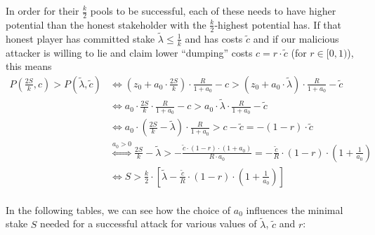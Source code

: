 \documentclass[11pt,a4paper]{article}
\begin{document}
In order for their \(\frac{k}{2}\) pools to be successful, each of these
needs to have higher potential than the honest stakeholder with the
\(\frac{k}{2}\)-highest potential has. If that honest player has
committed stake \(\tilde{\lambda}\leq\frac{1}{k}\) and has costs
\(\tilde{c}\) and if our malicious attacker is willing to lie and claim
lower ``dumping'' costs \(c=r\cdot\tilde{c}\) (for \(r\in[0,1)\)), this
means \[
\begin{split}
    P\left(\frac{2S}{k}, c\right) > P(\tilde{\lambda}, \tilde{c})
    &\Longleftrightarrow
    \left(z_0+a_0\cdot\frac{2S}{k}\right)\cdot\frac{R}{1+a_0}-c > \left(z_0+a_0\cdot\tilde{\lambda}\right)\cdot\frac{R}{1+a_0}-\tilde{c} \\
    &\Longleftrightarrow
    a_0\cdot\frac{2S}{k}\cdot\frac{R}{1+a_0}-c > a_0\cdot\tilde{\lambda}\cdot\frac{R}{1+a_0}-\tilde{c} \\
    &\Longleftrightarrow
    a_0\cdot\left(\frac{2S}{k}-\tilde{\lambda}\right)\cdot\frac{R}{1+a_0} > c-\tilde{c}=-(1-r)\cdot\tilde{c} \\
    &\stackrel{a_0>0}{\Longleftrightarrow}
    \frac{2S}{k}-\tilde{\lambda} > -\frac{\tilde{c}\cdot(1-r)\cdot(1+a_0)}{R\cdot a_0} =
    -\frac{\tilde{c}}{R}\cdot(1-r)\cdot\left(1 + \frac{1}{a_0}\right) \\
    &\Longleftrightarrow
    S > \frac{k}{2}\cdot\left[\tilde{\lambda}-\frac{\tilde{c}}{R}\cdot(1-r)\cdot\left(1+\frac{1}{a_0}\right)\right] \\
\end{split}
\]

In the following tables, we can see how the choice of \(a_0\) influences
the minimal stake \(S\) needed for a successful attack for various
values of \(\tilde{\lambda}\), \(\tilde{c}\) and \(r\):
\end{document}
